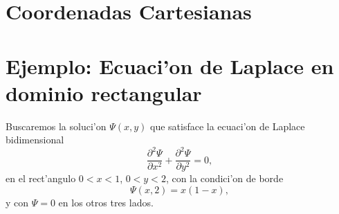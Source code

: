 \section{Coordenadas Cartesianas}
\section{Ejemplo: Ecuaci'on de Laplace en dominio rectangular}
Buscaremos la soluci'on $\Psi(x,y)$ que satisface la ecuaci'on de Laplace bidimensional
\begin{equation}\label{ejLap2D}
\frac{\partial^2\Psi }{\partial x^2}+\frac{\partial^2\Psi }{\partial y^2}=0,
\end{equation}
en el rect'angulo $0<x<1$, $0<y<2$, con la condici'on de borde
\begin{equation}
\Psi(x,2) = x(1-x), 
\end{equation}
y con $\Psi=0$ en los otros tres lados. 

